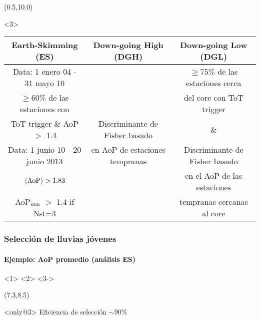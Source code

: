 \begin{frame}
\begin{center}
		\begin{textblock}{15}(0.5,10.0)
			\begin{exampleblock}{}<3>
				\begin{center}
					{\scriptsize
					\renewcommand{\arraystretch}{1.3}
						\begin{tabular}{|c|c|c|}
						\hline
						Earth-Skimming (ES)          & Down-going High (DGH)    & Down-going Low (DGL)                       \\
						\hline\hline
						Data: 1 enero 04 - 31 mayo 10 &                                      & $\geq 75\%$ de las estaciones cerca \\
						$\geq 60\%$ de las estaciones con  &                                      & del core con ToT trigger  \\
						ToT trigger \& AoP $>$ 1.4    & Discriminante de Fisher basado             &      \&                      \\
						\cline{1-1}
						Data: 1 junio 10 - 20 junio 2013   & en AoP de estaciones tempranas & Discriminante de Fisher basado  \\
						$\langle {\rm AoP} \rangle> 1.83$  &                                 &  en el AoP de las estaciones \\
						AoP$_{\rm min}$ $>$ 1.4 if Nst=3   &                                 & tempranas cercanas al core         \\
						\hline
						\end{tabular}
					}
				\end{center}
			\end{exampleblock}
		\end{textblock}
	\end{center}
\end{frame}

\begin{frame}
 \frametitle{Selecci\'on de lluvias j\'ovenes}
 \framesubtitle{Ejemplo: AoP promedio (an\'alisis ES)}
	\begin{center}
	<3->
	\end{center}
	
	\begin{textblock}{4.3}(7.3,8.5)
		\begin{alertblock}{}<only@3>
		\centering
	         Eficiencia de selecci\'on $\sim 90\%$	
		\end{alertblock}
	\end{textblock}
	
\end{frame}

